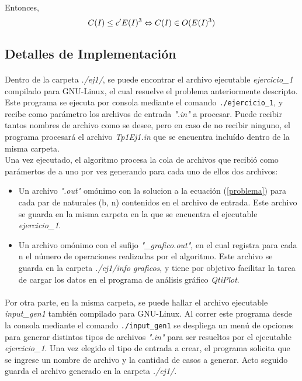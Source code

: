 {Entonces,
\begin{equation}
	C(I) \leq c' E(I)^{3} \Leftrightarrow C(I) \in O(E(I)^{3})
\end{equation}

\subsection{Detalles de Implementación}

\paragraph{}
Dentro de la carpeta \textit{./ej1/}, se puede encontrar el archivo ejecutable \textit{ejercicio\_1} compilado para GNU-Linux, el cual resuelve el problema anteriormente descripto. Este programa se ejecuta por consola mediante el comando \texttt{./ejercicio\_1}, y recibe como parámetro los archivos de entrada \textit{".in"} a procesar. Puede recibir tantos nombres de archivo como se desee, pero en caso de no recibir ninguno, el programa procesará el archivo \textit{Tp1Ej1.in} que se encuentra incluído dentro de la misma carpeta. \\
Una vez ejecutado, el algoritmo procesa la cola de archivos que recibió como parámertos de a uno por vez generando para cada uno de ellos dos archivos:
	\begin{itemize}
		\item{Un archivo \textit{".out"} omónimo con la solucion a la ecuación (\ref{problema}) para cada par de naturales (b, n) contenidos en el archivo de entrada. Este archivo se guarda en la misma carpeta en la que se encuentra el ejecutable \textit{ejercicio\_1}}.
		\item{Un archivo omónimo con el sufijo \textit{"\_grafico.out"}, en el cual registra para cada n el número de operaciones realizadas por el algoritmo. Este archivo se guarda en la carpeta \textit{./ej1/info graficos}, y tiene por objetivo facilitar la tarea de cargar los datos en el programa de análisis gráfico \textit{QtiPlot}}.
	\end{itemize}

\paragraph{}		
Por otra parte, en la misma carpeta, se puede hallar el archivo ejecutable \textit{input\_gen1} también compilado para GNU-Linux. Al correr este programa desde la consola mediante el comando \texttt{./input\_gen1} se despliega un menú de opciones para generar distintos tipos de archivos \textit{".in"} para ser resueltos por el ejecutable \textit{ejercicio\_1}. Una vez elegido el tipo de entrada a crear, el programa solicita que se ingrese un nombre de archivo y la cantidad de casos a generar. Acto seguido guarda el archivo generado en la carpeta \textit{./ej1/}.

}
